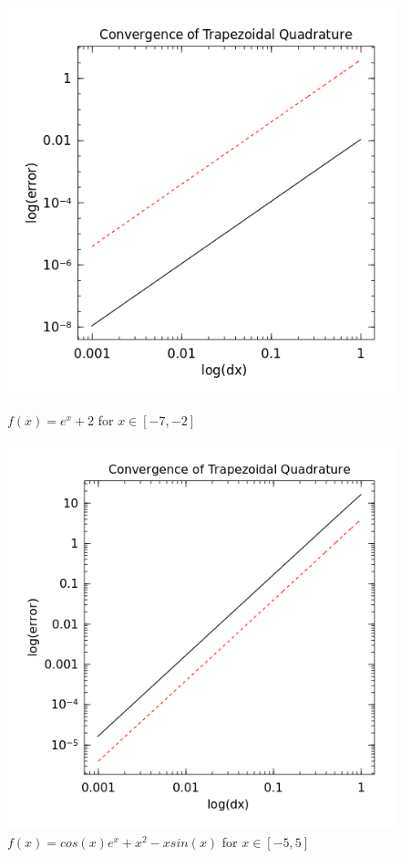 \documentclass[10pt]{article}
\begin{document}
\begin{figure}[h]
\centering
\begin{minipage}{.5\textwidth}
  \centering
  \includegraphics[width=.85\linewidth]{trap_case5.png}
  \caption*{$f(x) = e^x + 2$ for $x \in [-7,-2]$}
  \label{fig:test1}
\end{minipage}%
\begin{minipage}{.5\textwidth}
  \centering
  \includegraphics[width=.85\linewidth]{trap_case7.png}
  \caption*{$f(x) = cos(x)e^x + x^2 - xsin(x)$ for $x \in [-5,5]$}
  \label{fig:test2}
\end{minipage}
\end{figure}
\end{document}
